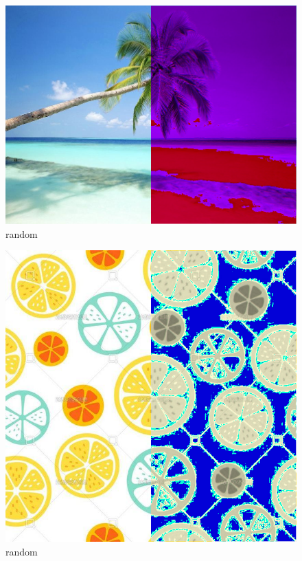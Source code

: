 \documentclass[10pt]{article}
\begin{document}
\begin{figure}[h]
  \centering
  \includegraphics*[scale=0.25]{finalrandomini.png}
\caption{ random }
\end{figure}
\begin{figure}[h]
  \centering
  \includegraphics*[scale=0.25]{微信图片_20210503105547.png}
\caption{ random }
\end{figure}
\end{document}
